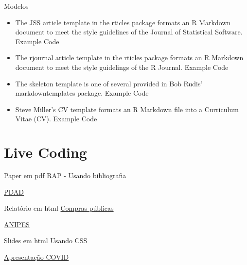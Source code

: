 \documentclass[
  9pt,
  ignorenonframetext,
]{beamer}
\begin{document}
\begin{frame}{Modelos}
\protect\hypertarget{modelos}{}
\begin{itemize}
\item
  The JSS article template in the rticles package formats an R Markdown
  document to meet the style guidelines of the Journal of Statistical
  Software. Example Code
\item
  The rjournal article template in the rticles package formats an R
  Markdown document to meet the style guidelings of the R Journal.
  Example Code
\item
  The skeleton template is one of several provided in Bob Rudis'
  markdowntemplates package. Example Code
\item
  Steve Miller's CV template formats an R Markdown file into a
  Curriculum Vitae (CV). Example Code
\end{itemize}
\end{frame}

\hypertarget{live-coding}{%
\section{Live Coding}\label{live-coding}}

\begin{frame}{Paper em pdf}
\protect\hypertarget{paper-em-pdf}{}
RAP - Usando bibliografia

\href{http://www.codeplan.df.gov.br/wp-content/uploads/2020/06/Itapo\%C3\%A3.pdf}{PDAD}
\end{frame}

\begin{frame}{Relatório em html}
\protect\hypertarget{relatuxf3rio-em-html}{}
\href{http://www.codeplan.df.gov.br/wp-content/uploads/2018/02/Cartografia-das-compras-p\%C3\%BAblicas-de-bens-e-servi\%C3\%A7os-privados-no-DF.html}{Compras
públicas}

\href{https://rpubs.com/fredbsr/ANIPES}{ANIPES}
\end{frame}

\begin{frame}{Slides em html}
\protect\hypertarget{slides-em-html}{}
Usando CSS

\href{https://github.com/fredbsr/covid19br_OP}{Apresentação COVID}
\end{frame}
\end{document}
